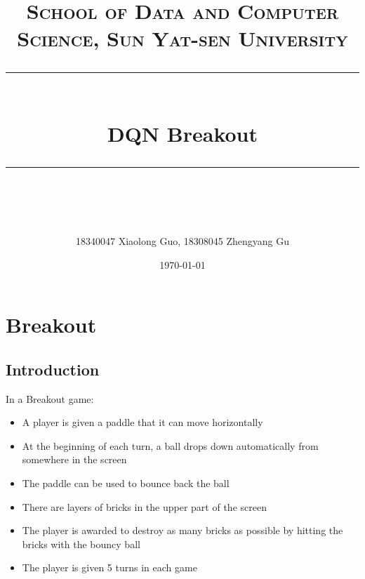 \documentclass[a4paper, 11pt]{article}
\title{	
\normalfont \normalsize
\textsc{School of Data and Computer Science, Sun Yat-sen University} \\ [25pt] %
\rule{\textwidth}{0.5pt} \\[0.4cm] %
\huge DQN Breakout \\ %
\rule{\textwidth}{2pt} \\[0.5cm] %
\author{18340047 Xiaolong Guo, 18308045 Zhengyang Gu}
\date{\normalsize\today}
}
\begin{document}
\maketitle
\tableofcontents
\newpage
{}
\section{Breakout}
\subsection{Introduction}
In a Breakout game:
\begin{itemize}\setlength{\itemsep}{-\itemsep}
      \item A player is given a paddle that it can move horizontally
      \item At the beginning of each turn, a ball drops down automatically from somewhere in the screen
      \item The paddle can be used to bounce back the ball
      \item There are layers of bricks in the upper part of the screen
      \item The player is awarded to destroy as many bricks as possible by hitting the bricks with the bouncy ball
      \item The player is given 5 turns in each game
\end{itemize}
\end{document}
